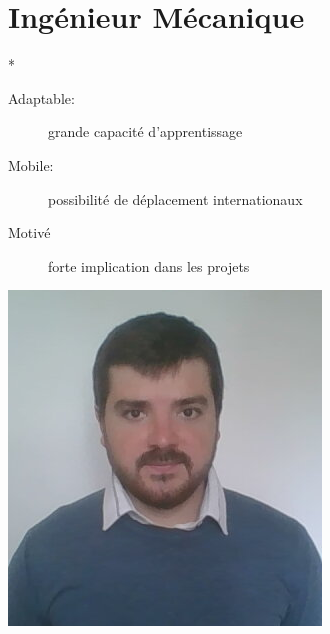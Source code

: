 \documentclass[10pt,a4paper,sans]{article}
\begin{document}
\begin{minipage}{0.36\textwidth}
    
\end{minipage}
\begin{minipage}{0.63\textwidth}
    \section{Ingénieur Mécanique}*

    \begin{minipage}{0.65\textwidth}
        \begin{description}
            \item[Adaptable:]grande capacité d'apprentissage
            \item[Mobile:]possibilité de déplacement internationaux
            \item[Motivé]forte implication dans les projets
        \end{description}
    \end{minipage}
    \begin{minipage}{0.33\textwidth}
        \includegraphics[width=\textwidth]{img/image_CV.png}
    \end{minipage}
\end{minipage}
\end{document}
